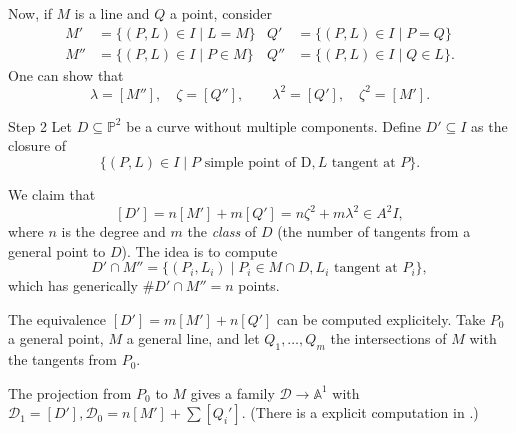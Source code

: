 \documentclass{beamer}
\renewcommand{\P}{\mathbb{P}}
\begin{document}
\begin{frame}
Now, if $M$ is a line and $Q$ a point, consider
\begin{align*}
M' &= \{(P, L) \in I \mid L=M\} & Q' &= \{(P, L) \in I \mid P=Q\} \\
M'' &= \{(P, L) \in I \mid P \in M\} & Q'' &= \{(P, L) \in I \mid Q \in L\}.
\end{align*}
One can show that
\[ \lambda=[M''], \quad \zeta = [Q''], \qquad \lambda^2=[Q'], \quad \zeta^2 = [M']. \]
\end{frame}



\begin{frame}{Step 2}
Let $D \subseteq \P^2$ be a curve without multiple components. Define $D' \subseteq I$ as the closure of
\[ \{(P, L) \in I \mid P \text{ simple point of D}, L \text{ tangent at }P\}. \]

\pause 

We claim that
\[ [D'] = n[M']+m[Q'] = n\zeta^2+m \lambda^2 \in A^2I, \]
where $n$ is the degree and $m$ the \emph{class} of $D$ (the number of tangents from a general point to $D$). The idea is to compute 
\[ D' \cap M'' = \{(P_i, L_i) \mid P_i \in M \cap D, L_i \text{ tangent at }P_i\}, \]
which has generically $\# D' \cap M''=n$ points.  
\end{frame}



\begin{frame}
The equivalence $[D']=m[M']+n[Q']$ can be computed explicitely. Take $P_0$ a general point, $M$ a general line, and let $Q_1, \dots, Q_m$ the intersections of $M$ with the tangents from $P_0$.
\begin{figure}[H]
\centering
{}
\end{figure}
\pause

The projection from $P_0$ to $M$ gives a family $\mathscr{D} \to \mathbb{A}^1$ with $\mathscr{D}_1=[D'], \mathscr{D}_0 = n[M']+\sum [Q_i']$. (There is a explicit computation in .) 
\end{frame}
\end{document}
